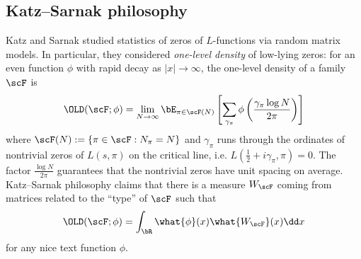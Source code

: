 \subsection{Katz--Sarnak philosophy}


Katz and Sarnak \cite{katz1999zeroes,katz2023random} studied statistics of zeros of $L$-functions via random matrix models.
In particular, they considered \emph{one-level density} of low-lying zeros: for an even function $\phi$ with rapid decay as $|x| \to \infty$, the one-level density of a family $\scF$ is
\begin{equation}
    \OLD(\scF; \phi) = \lim_{N \to \infty} \bE_{\pi \in \scF(N)} \left[\sum_{\gamma_\pi} \phi\left(\frac{\gamma_\pi \log N}{2 \pi}\right)\right]
\end{equation}
where $\scF(N) := \{\pi \in \scF: N_\pi = N\}$ and $\gamma_\pi$ runs through the ordinates of nontrivial zeros of $L(s, \pi)$ on the critical line, i.e. $L\left(\frac{1}{2} + i\gamma_\pi, \pi\right) = 0$.
The factor $\frac{\log N}{2\pi}$ guarantees that the nontrivial zeros have unit spacing on average.
Katz--Sarnak philosophy claims that there is a measure $W_\scF$ coming from matrices related to the ``type'' of $\scF$ such that
\begin{equation}
    \OLD(\scF; \phi) = \int_{\bR} \what{\phi}(x) \what{W_\scF}(x) \dd x
\end{equation}
for any nice text function $\phi$.

